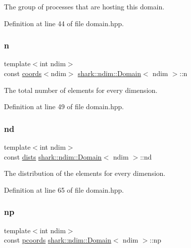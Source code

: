 The group of processes that are hosting this domain. 

Definition at line 44 of file domain.\+hpp.

\hypertarget{classshark_1_1ndim_1_1_domain_ab942ffcf99c5ee0f2589c8b9104abcfd}{}\label{classshark_1_1ndim_1_1_domain_ab942ffcf99c5ee0f2589c8b9104abcfd} 
\subsubsection{\texorpdfstring{n}{n}}
{\footnotesize\ttfamily template$<$int ndim$>$ \\
const \hyperlink{structshark_1_1ndim_1_1coords}{coords}$<$ndim$>$ \hyperlink{classshark_1_1ndim_1_1_domain}{shark\+::ndim\+::\+Domain}$<$ ndim $>$\+::n}

The total number of elements for every dimension. 

Definition at line 49 of file domain.\+hpp.

\hypertarget{classshark_1_1ndim_1_1_domain_a4964336cc4ccdb2bfcc616fdcbb9a570}{}\label{classshark_1_1ndim_1_1_domain_a4964336cc4ccdb2bfcc616fdcbb9a570} 
\subsubsection{\texorpdfstring{nd}{nd}}
{\footnotesize\ttfamily template$<$int ndim$>$ \\
const \hyperlink{classshark_1_1ndim_1_1_domain_a8d425ae958ccde33494fe1346307e991}{dists} \hyperlink{classshark_1_1ndim_1_1_domain}{shark\+::ndim\+::\+Domain}$<$ ndim $>$\+::nd}

The distribution of the elements for every dimension. 

Definition at line 65 of file domain.\+hpp.

\hypertarget{classshark_1_1ndim_1_1_domain_a1d15ab99cb54dcc456c5bba8699bcddf}{}\label{classshark_1_1ndim_1_1_domain_a1d15ab99cb54dcc456c5bba8699bcddf} 
\subsubsection{\texorpdfstring{np}{np}}
{\footnotesize\ttfamily template$<$int ndim$>$ \\
const \hyperlink{classshark_1_1ndim_1_1_domain_a9684ccd8af33cff7639c782290ac37ee}{pcoords} \hyperlink{classshark_1_1ndim_1_1_domain}{shark\+::ndim\+::\+Domain}$<$ ndim $>$\+::np}


